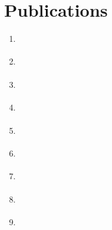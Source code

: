 \normalsize
\section{Publications}
\begin{enumerate}

	\item {} \label{ans_2017} \vspace{4mm}
	\item {} \label{nair} \vspace{4mm}
	\item {} \label{aries} \vspace{4mm}
	\item {} \label{ans_2013} \vspace{4mm}
	\item {} \label{fy12} \vspace{4mm}
	\item {} \label{mcnp6_um} \vspace{4mm}
	\item {} \label{mst1} \vspace{4mm}
	\item {} \label{mst2} \vspace{4mm}
	\item {} \label{uga} \vspace{4mm}
	
\end{enumerate}



